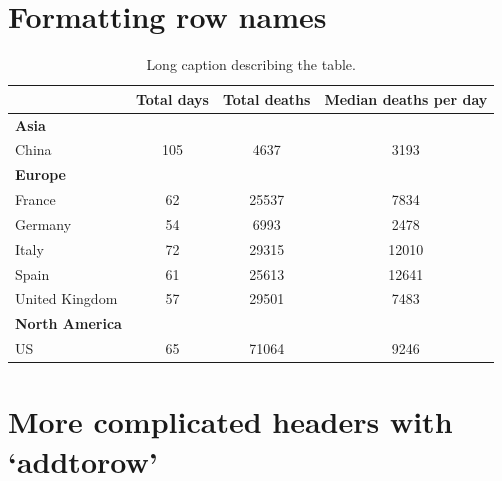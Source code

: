 \documentclass[12pt,]{book}
\begin{document}
\hypertarget{formatting-row-names}{%
\section{Formatting row names}\label{formatting-row-names}}

\begin{table}[ht]
\centering
\begingroup\fontsize{12pt}{12pt}\selectfont
\begin{tabular}{lccc}
  \toprule
 & Total days & Total deaths & Median deaths per day \\ 
  \midrule
\textbf{Asia } &  &  &  \\ 
  \vspace{.4cm} \hspace{.2cm} China & 105 & 4637 & 3193 \\ 
  \textbf{Europe } &  &  &  \\ 
  \hspace{.2cm} France & 62 & 25537 & 7834 \\ 
  \hspace{.2cm} Germany & 54 & 6993 & 2478 \\ 
  \hspace{.2cm} Italy & 72 & 29315 & 12010 \\ 
  \hspace{.2cm} Spain & 61 & 25613 & 12641 \\ 
  \vspace{.4cm} \hspace{.2cm} United Kingdom & 57 & 29501 & 7483 \\ 
  \textbf{North America } &  &  &  \\ 
  \hspace{.2cm} US & 65 & 71064 & 9246 \\ 
   \bottomrule
\end{tabular}
\endgroup
\caption[xtable with row headings: short caption for LoT]{\label{tab:table1xtable2} Long caption describing the table.} 
\end{table}

\pagebreak

\hypertarget{more-complicated-headers-with-addtorow}{%
\section{More complicated headers with `addtorow'}\label{more-complicated-headers-with-addtorow}}
\end{document}
